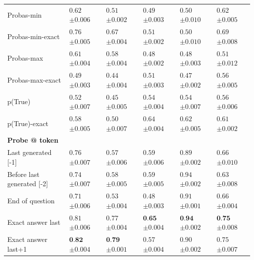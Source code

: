 \begin{table}[t]
{\begin{tabular}{l|lllll}
Probas-min & $0.62$ \tiny$\pm 0.006$ & $0.51$ \tiny$\pm 0.002$ & $0.49$ \tiny$\pm 0.003$ & $0.50$ \tiny$\pm 0.010$ & $0.62$ \tiny$\pm 0.005$ \\
Probas-min-exact & $0.76$ \tiny$\pm 0.005$ & $0.67$ \tiny$\pm 0.004$ & $0.51$ \tiny$\pm 0.002$ & $0.50$ \tiny$\pm 0.010$ & $0.69$ \tiny$\pm 0.008$ \\
Probas-max & $0.61$ \tiny$\pm 0.004$ & $0.58$ \tiny$\pm 0.004$ & $0.48$ \tiny$\pm 0.002$ & $0.48$ \tiny$\pm 0.003$ & $0.51$ \tiny$\pm 0.012$ \\
Probas-max-exact & $0.49$ \tiny$\pm 0.003$ & $0.44$ \tiny$\pm 0.004$ & $0.51$ \tiny$\pm 0.003$ & $0.47$ \tiny$\pm 0.002$ & $0.56$ \tiny$\pm 0.005$ \\
p(True) & $0.52$ \tiny$\pm 0.007$ & $0.45$ \tiny$\pm 0.005$ & $0.54$ \tiny$\pm 0.004$ & $0.54$ \tiny$\pm 0.007$ & $0.56$ \tiny$\pm 0.006$ \\
p(True)-exact & $0.58$ \tiny$\pm 0.005$ & $0.50$ \tiny$\pm 0.007$ & $0.64$ \tiny$\pm 0.004$ & $0.62$ \tiny$\pm 0.005$ & $0.61$ \tiny$\pm 0.002$ \\
\midrule
\textbf{Probe @ token} \\
\midrule

Last generated [-1] & $0.76$ \tiny$\pm 0.007$ & $0.57$ \tiny$\pm 0.006$ & $0.59$ \tiny$\pm 0.006$ & $0.89$ \tiny$\pm 0.002$ & $0.66$ \tiny$\pm 0.010$ \\
Before last generated [-2] & $0.74$ \tiny$\pm 0.007$ & $0.58$ \tiny$\pm 0.005$ & $0.59$ \tiny$\pm 0.005$ & $0.94$ \tiny$\pm 0.002$ & $0.63$ \tiny$\pm 0.008$ \\
End of question & $0.71$ \tiny$\pm 0.006$ & $0.53$ \tiny$\pm 0.004$ & $0.48$ \tiny$\pm 0.003$ & $0.91$ \tiny$\pm 0.001$ & $0.66$ \tiny$\pm 0.004$ \\
\midrule
Exact answer last & $0.81$ \tiny$\pm 0.006$ & $0.77$ \tiny$\pm 0.004$ & $\textbf{0.65}$ \tiny$\pm 0.004$ & $\textbf{0.94}$ \tiny$\pm 0.002$ & $\textbf{0.75}$ \tiny$\pm 0.008$ \\
Exact answer last+1 & $\textbf{0.82}$ \tiny$\pm 0.004$ & $\textbf{0.79}$ \tiny$\pm 0.001$ & $0.57$ \tiny$\pm 0.004$ & $0.90$ \tiny$\pm 0.002$ & $0.75$ \tiny$\pm 0.007$ \\
     \bottomrule
    \end{tabular}}
    \label{tab:llama_regular_error_detection}
\end{table}